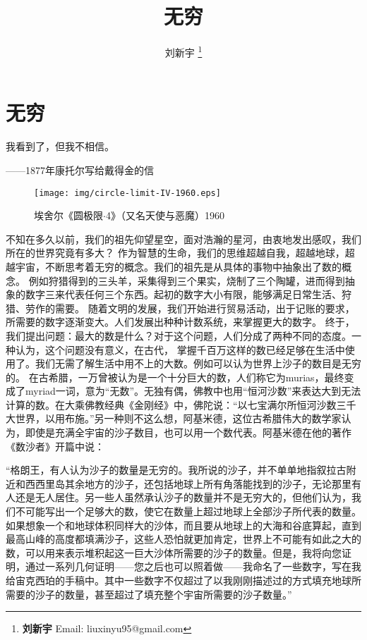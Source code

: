 \documentclass{article}
\begin{document}
\title{无穷}

\author{刘新宇
\thanks{{\bfseries 刘新宇} \newline
  Email: liuxinyu95@gmail.com \newline}
  }

\maketitle
\fi


\ifx\wholebook\relax
\chapter{无穷}
\fi

\epigraph{我看到了，但我不相信。}{——1877年康托尔写给戴得金的信}


\begin{wrapfigure}{R}{0.5\textwidth}
 \centering
 \texttt{[image: img/circle-limit-IV-1960.eps]}
 \captionsetup{labelformat=empty}
 \caption{埃舍尔《圆极限$\cdot$4》（又名天使与恶魔）1960}
 \label{fig:Penrose-triangle}
\end{wrapfigure}

不知在多久以前，我们的祖先仰望星空，面对浩瀚的星河，由衷地发出感叹，我们所在的世界究竟有多大？
作为智慧的生命，我们的思维超越自我，超越地球，超越宇宙，不断思考着无穷的概念。我们的祖先是从具体的事物中抽象出了数的概念。
例如狩猎得到的三头羊，采集得到三个果实，烧制了三个陶罐，进而得到抽象的数字三来代表任何三个东西。起初的数字大小有限，能够满足日常生活、狩猎、劳作的需要。
随着文明的发展，我们开始进行贸易活动，出于记账的要求，所需要的数字逐渐变大。人们发展出种种计数系统，来掌握更大的数字。
终于，我们提出问题：最大的数是什么？对于这个问题，人们分成了两种不同的态度。一种认为，这个问题没有意义，在古代，
掌握千百万这样的数已经足够在生活中使用了。我们无需了解生活中用不上的大数。例如可以认为世界上沙子的数目是无穷的。
在古希腊，一万曾被认为是一个十分巨大的数，人们称它为murias，最终变成了myriad一词，意为“无数”\cite{De-linfini-2018}。无独有偶，佛教中也用“恒河沙数”来表达大到无法计算的数。在大乘佛教经典《金刚经》中，佛陀说：“以七宝满尔所恒河沙数三千大世界，以用布施。”另一种则不这么想，阿基米德，这位古希腊伟大的数学家认为，即使是充满全宇宙的沙子数目，也可以用一个数代表。阿基米德在他的著作《数沙者》开篇中说：

“格朗王，有人认为沙子的数量是无穷的。我所说的沙子，并不单单地指叙拉古附近和西西里岛其余地方的沙子，还包括地球上所有角落能找到的沙子，无论那里有人还是无人居住。另一些人虽然承认沙子的数量并不是无穷大的，但他们认为，我们不可能写出一个足够大的数，使它在数量上超过地球上全部沙子所代表的数量。如果想象一个和地球体积同样大的沙体，而且要从地球上的大海和谷底算起，直到最高山峰的高度都填满沙子，这些人恐怕就更加肯定，世界上不可能有如此之大的数，可以用来表示堆积起这一巨大沙体所需要的沙子的数量。但是，我将向您证明，通过一系列几何证明——您之后也可以照着做——我命名了一些数字，写在我给宙克西珀的手稿中。其中一些数字不仅超过了以我刚刚描述过的方式填充地球所需要的沙子的数量，甚至超过了填充整个宇宙所需要的沙子数量。”
\end{document}
